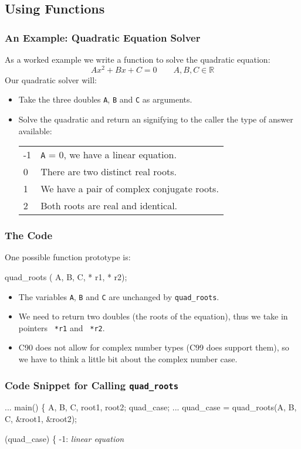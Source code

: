 \documentclass[smaller,table]{beamer} %
\begin{document}
\subsection{Using Functions}
\begin{frame}
\frametitle{An Example: Quadratic Equation Solver}
As a worked example we write a function to solve the quadratic equation:
$$ A x^2 + B x + C=0 \qquad A,B,C\in\mathbb{R}$$
Our quadratic solver will:
\begin{itemize}
\item Take the three doubles {\tt A}, {\tt B} and {\tt C} as arguments.
\item Solve the quadratic and return an  signifying to the caller the type of answer available:
\begin{tabular}{l l}
-1&{\tt A} = 0, we have a linear equation.\\
0&There are two distinct real roots.\\
1&We have a pair of complex conjugate roots.\\
2&Both roots are real and identical.
\end{tabular}
\end{itemize}
\end{frame}

\begin{frame}[fragile]
\frametitle{The Code}
One possible function prototype is:
\begin{semiverbatim}
 quad_roots ( A,  B,  C,
                 * r1,  * r2);
\end{semiverbatim}
\begin{itemize}
\item The variables {\tt A}, {\tt B} and {\tt C} are unchanged by {\tt quad\_roots}.
\item We need to return two doubles (the roots of the equation), thus we take in pointers {\tt {} *r1} and {\tt {} *r2}.
\item C90 does not allow for complex number types (C99 does support them), so we have to think a little bit about the complex number case.
\end{itemize}
\end{frame}

\begin{frame}[fragile]
\frametitle{Code Snippet for Calling {\tt quad\_roots}}
\begin{semiverbatim}
...
 main()
\{
    A, B, C, root1, root2;
    quad_case;   
   ...   
   quad\_case = quad\_roots(A, B, C, \&root1,
                          \&root2);
                          
   (quad\_case)
   \{
    -1: \emph{linear equation}
\end{semiverbatim}
\end{frame}
\end{document}
